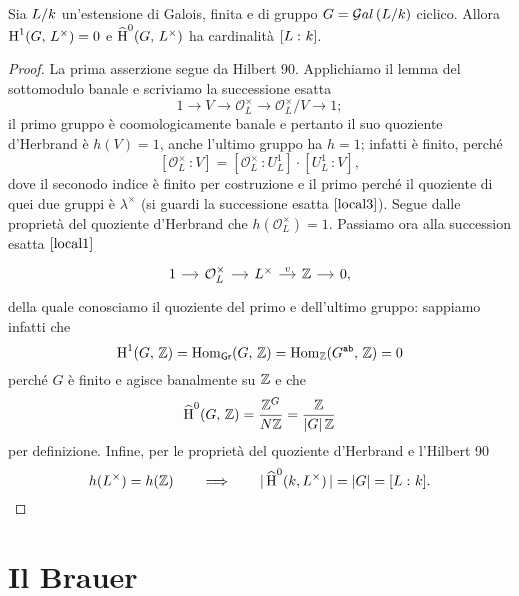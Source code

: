 \begin{theorem} 
	Sia $ L/k $ un'estensione di Galois, finita e di gruppo $ G = \mathcal{G}al\left( L/k \right) $ ciclico. Allora $ \operatorname{H}^1(G, \, L^\times) = 0 $ e $ \operatorname{\widehat{H}}^0(G, \, L^\times) $ ha cardinalità $ [L \, \colon k] $.
\end{theorem}
\begin{proof}
	La prima asserzione segue da Hilbert 90. Applichiamo il lemma del sottomodulo banale e scriviamo la successione esatta 
	\[ 1 \to V \to \mathcal{O}_L^\times \to \mathcal{O}_L^\times/V \to 1; \]
	il primo gruppo è coomologicamente banale e pertanto il suo quoziente d'Herbrand è $ h(V) = 1 $, anche l'ultimo gruppo ha $ h = 1 $; infatti è finito, perché $$  [\mathcal{O}_L^\times \, \colon V] = [\mathcal{O}_L^\times \,\colon U_L^1]\cdot[U_L^1 \,\colon V],  $$
	dove il seconodo indice è finito per costruzione e il primo perché il quoziente di quei due gruppi è $ \lambda^\times $ (si guardi la successione esatta $ \ref{local3} $). Segue dalle proprietà del quoziente d'Herbrand che $ h(\mathcal{O}_L^\times) = 1 $. Passiamo ora alla succession esatta $ \ref{local1} $
	\[ \begin{tikzcd}[column sep = small]
	1 \rar
	& \mathcal{O}_{L}^\times \rar
	& L^\times \rar["v"]
	& \Z \rar
	& 0,
	\end{tikzcd} \]
	della quale conosciamo il quoziente del primo e dell'ultimo gruppo: sappiamo infatti che $$  \operatorname{H}^1(G, \, \mathbb{Z}) = \operatorname{Hom}_\mathsf{Gr}(G, \, \mathbb{Z}) = \operatorname{Hom}_{\mathbb{Z}}(G^\texttt{ab}, \, \mathbb{Z}) = 0  $$ perché $ G $ è finito e agisce banalmente su $ \mathbb{Z} $ e che $$  \operatorname{\widehat{H}}^0(G, \, \mathbb{Z}) = \frac{\mathbb{Z}^G}{ N\mathbb{Z}} = \frac{\mathbb{Z}}{ |G|\, \mathbb{Z}}  $$ per definizione. Infine, per le proprietà del quoziente d'Herbrand e l'Hilbert 90
	\[ h(L^\times) = h(\mathbb{Z}) \qquad\Longrightarrow\qquad |\operatorname{\widehat{H}}^0(k, L^\times)\, | = |G| = [L \, \colon k]. \]
\end{proof}


\section{Il Brauer}

